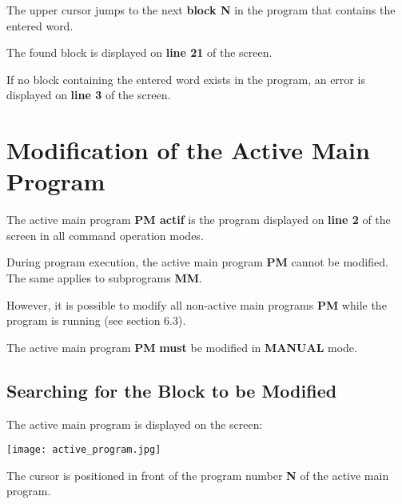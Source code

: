The upper cursor jumps to the next \textbf{block N} in the program that contains the entered word.

The found block is displayed on \textbf{line 21} of the screen.

\notes

If no block containing the entered word exists in the program, an error is displayed on \textbf{line 3} of the screen.

\section{Modification of the Active Main Program}

The active main program \textbf{PM actif} is the program displayed on \textbf{line 2} of the screen in all command operation modes.

During program execution, the active main program \textbf{PM} cannot be modified. The same applies to subprograms \textbf{MM}.

However, it is possible to modify all non-active main programs \textbf{PM} while the program is running (see section 6.3).

The active main program \textbf{PM} \textbf{must} be modified in \textbf{MANUAL} mode.

\newpage
\subsection{Searching for the Block to be Modified}

\begin{itemize}
\end{itemize}

\vspace{.5cm}

\begin{itemize}
\end{itemize}

\vspace{.5cm}

The active main program is displayed on the screen:

\begin{center}
    \texttt{[image: active\_program.jpg]}
\end{center}

The cursor is positioned in front of the program number \textbf{N} of the active main program.

